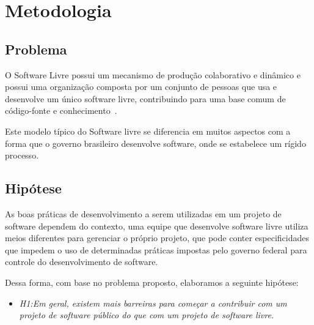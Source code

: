 \chapter{Metodologia}
\label{sec:metodologia}


\section{Problema}

O Software Livre possui um mecanismo de produção colaborativo e dinâmico 
e possui uma organização composta por um conjunto de pessoas que usa e desenvolve 
um único software livre, contribuindo para uma base comum de código-fonte e 
conhecimento~\cite{reis2003caracterizacc}.

Este modelo típico do Software livre se diferencia em muitos aspectos com a forma
que o governo brasileiro desenvolve software, onde se estabelece um rígido processo.


\section{Hipótese}

As boas práticas de desenvolvimento a serem utilizadas em um projeto de software 
dependem do contexto, uma equipe que desenvolve software livre utiliza
meios diferentes para gerenciar o próprio projeto, que pode conter especificidades 
que impedem o uso de determinadas práticas impostas pelo governo federal para controle
do desenvolvimento de software. 

Dessa forma, com base no problema proposto, elaboramos a seguinte hipótese:

\begin{itemize}
\item \emph{H1:Em geral, existem mais barreiras para começar a contribuir 
com um projeto de software público do que com um projeto de software livre.}

\end{itemize}


